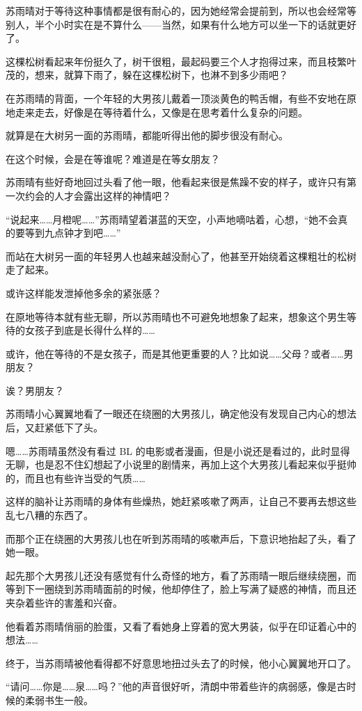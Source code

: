 苏雨晴对于等待这种事情都是很有耐心的，因为她经常会提前到，所以也会经常等别人，半个小时实在是不算什么——当然，如果有什么地方可以坐一下的话就更好了。

这棵松树看起来年份挺久了，树干很粗，最起码要三个人才抱得过来，而且枝繁叶茂的，想来，就算下雨了，躲在这棵松树下，也淋不到多少雨吧？

在苏雨晴的背面，一个年轻的大男孩儿戴着一顶淡黄色的鸭舌帽，有些不安地在原地走来走去，好像是在等待着什么，又像是在思考着什么复杂的问题。

就算是在大树另一面的苏雨晴，都能听得出他的脚步很没有耐心。

在这个时候，会是在等谁呢？难道是在等女朋友？

苏雨晴有些好奇地回过头看了他一眼，他看起来很是焦躁不安的样子，或许只有第一次约会的人才会露出这样的神情吧？

“说起来……月橙呢……”苏雨晴望着湛蓝的天空，小声地嘀咕着，心想，“她不会真的要等到九点钟才到吧……”

而站在大树另一面的年轻男人也越来越没耐心了，他甚至开始绕着这棵粗壮的松树走了起来。

或许这样能发泄掉他多余的紧张感？

在原地等待本就有些无聊，所以苏雨晴也不可避免地想象了起来，想象这个男生等待的女孩子到底是长得什么样的……

或许，他在等待的不是女孩子，而是其他更重要的人？比如说……父母？或者……男朋友？

诶？男朋友？

苏雨晴小心翼翼地看了一眼还在绕圈的大男孩儿，确定他没有发现自己内心的想法后，又赶紧低下了头。

嗯……苏雨晴虽然没有看过 BL 的电影或者漫画，但是小说还是看过的，此时显得无聊，也是忍不住幻想起了小说里的剧情来，再加上这个大男孩儿看起来似乎挺帅的，而且也有些许当受的气质……

这样的脑补让苏雨晴的身体有些燥热，她赶紧咳嗽了两声，让自己不要再去想这些乱七八糟的东西了。

而那个正在绕圈的大男孩儿也在听到苏雨晴的咳嗽声后，下意识地抬起了头，看了她一眼。

起先那个大男孩儿还没有感觉有什么奇怪的地方，看了苏雨晴一眼后继续绕圈，而等到下一圈绕到苏雨晴面前的时候，他却停住了，脸上写满了疑惑的神情，而且还夹杂着些许的害羞和兴奋。

他看着苏雨晴俏丽的脸蛋，又看了看她身上穿着的宽大男装，似乎在印证着心中的想法……

终于，当苏雨晴被他看得都不好意思地扭过头去了的时候，他小心翼翼地开口了。

“请问……你是……泉……吗？”他的声音很好听，清朗中带着些许的病弱感，像是古时候的柔弱书生一般。

